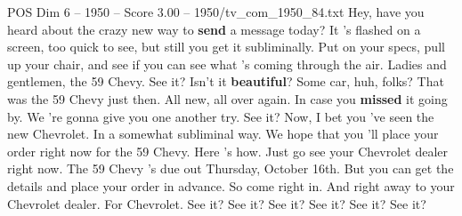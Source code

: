 \begin{textsample}{POS Dim 6 – 1950 – Score 3.00 – 1950/tv\_com\_1950\_84.txt}  \label{ex:f6_pos_003}
Hey, have you heard about the crazy new way to \textbf{send} a message today?
It 's flashed on a screen, too quick to see, but still you get it subliminally.
Put on your specs, pull up your chair, and see if you can see what 's coming through the air.
Ladies and gentlemen, the 59 Chevy.
See it?
Isn't it \textbf{beautiful}?
Some car, huh, folks?
That was the 59 Chevy just then.
All new, all over again.
In case you \textbf{missed} it going by.
We 're gonna give you one another try.
See it?
Now, I bet you 've seen the new Chevrolet.
In a somewhat subliminal way.
We hope that you 'll place your order right now for the 59 Chevy.
Here 's how.
Just go see your Chevrolet dealer right now.
The 59 Chevy 's due out Thursday, October 16th.
But you can get the details and place your order in advance.
So come right in.
And right away to your Chevrolet dealer.
For Chevrolet.
See it?
See it?
See it?
See it?
See it?
See it?

\end{textsample}
